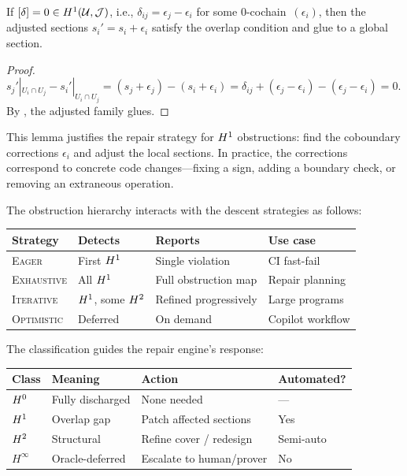 \documentclass[11pt]{article}
\begin{document}
\begin{lemma}\label{lem:coboundary}
If $[\delta] = 0 \in H^{1}(\mathcal{U}, \mathcal{J})$, i.e., $\delta_{ij} =
\epsilon_j - \epsilon_i$ for some $0$-cochain~$(\epsilon_i)$, then the
adjusted sections $s_i' = s_i + \epsilon_i$ satisfy the overlap condition
and glue to a global section.
\end{lemma}

\begin{proof}
$s_j'|_{U_i \cap U_j} - s_i'|_{U_i \cap U_j} = (s_j + \epsilon_j) -
(s_i + \epsilon_i) = \delta_{ij} + (\epsilon_j - \epsilon_i) - (\epsilon_j
- \epsilon_i) = 0$.  By , the adjusted family glues.
\end{proof}

This lemma justifies the repair strategy for $H^{1}$ obstructions:
find the coboundary corrections $\epsilon_i$ and adjust the local sections.
In practice, the corrections correspond to concrete code changes---fixing
a sign, adding a boundary check, or removing an extraneous operation.

The obstruction hierarchy interacts with the descent strategies as follows:

\begin{center}
\begin{tabular}{@{}lllp{4.8cm}@{}}
\toprule
\textbf{Strategy} & \textbf{Detects} & \textbf{Reports} & \textbf{Use case} \\
\midrule
\textsc{Eager} & First $H^{1}$ & Single violation & CI fast-fail \\
\textsc{Exhaustive} & All $H^{1}$ & Full obstruction map & Repair planning \\
\textsc{Iterative} & $H^{1}$, some $H^{2}$ & Refined progressively &
  Large programs \\
\textsc{Optimistic} & Deferred & On demand & Copilot workflow \\
\bottomrule
\end{tabular}
\end{center}

The classification guides the repair engine's response:

\begin{center}
\begin{tabular}{@{}llll@{}}
\toprule
\textbf{Class} & \textbf{Meaning} & \textbf{Action} & \textbf{Automated?} \\
\midrule
$H^{0}$ & Fully discharged & None needed & --- \\
$H^{1}$ & Overlap gap      & Patch affected sections & Yes \\
$H^{2}$ & Structural       & Refine cover / redesign & Semi-auto \\
$H^{\infty}$ & Oracle-deferred & Escalate to human/prover & No \\
\bottomrule
\end{tabular}
\end{center}
\end{document}
